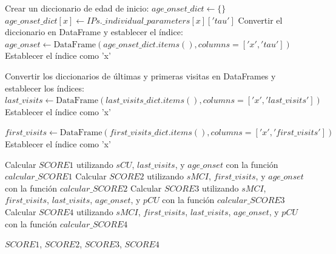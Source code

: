 \begin{description}
\begin{algorithm}
\begin{algorithmic}[1]
			\STATE Crear un diccionario de edad de inicio:
			\STATE $age\_onset\_dict \gets \{\}$
			\STATE $age\_onset\_dict[x] \gets IPs.\_individual\_parameters[x]['tau']$
			\ENDFOR
			\STATE Convertir el diccionario en DataFrame y establecer el índice:
			\STATE $age\_onset \gets \text{DataFrame}(age\_onset\_dict.items(), columns=['x', 'tau'])$
			\STATE Establecer el índice como 'x'
			
			\STATE Convertir los diccionarios de últimas y primeras visitas en DataFrames y establecer los índices:
			\STATE $last\_visits \gets \text{DataFrame}(last\_visits\_dict.items(), columns=['x', 'last\_visits'])$
			\STATE Establecer el índice como 'x'
			
			\STATE $first\_visits \gets \text{DataFrame}(first\_visits\_dict.items(), columns=['x', 'first\_visits'])$
			\STATE Establecer el índice como 'x'
			
			\STATE Calcular $SCORE1$ utilizando $sCU$, $last\_visits$, y $age\_onset$ con la función $calcular\_SCORE1$
			\STATE Calcular $SCORE2$ utilizando $sMCI$, $first\_visits$, y $age\_onset$ con la función $calcular\_SCORE2$
			\STATE Calcular $SCORE3$ utilizando $sMCI$, $first\_visits$, $last\_visits$, $age\_onset$, y $pCU$ con la función $calcular\_SCORE3$
			\STATE Calcular $SCORE4$ utilizando $sMCI$, $first\_visits$, $last\_visits$, $age\_onset$, y $pCU$ con la función $calcular\_SCORE4$
			
			\RETURN $SCORE1$, $SCORE2$, $SCORE3$, $SCORE4$
		\end{algorithmic}
	\end{algorithm}

	
	
\end{description}
